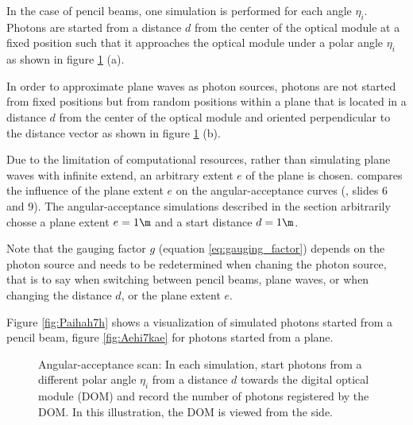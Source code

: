 In the case of pencil beams, one simulation is performed for each angle $\eta_i$. Photons are started from a distance $d$ from the center of the optical module at a fixed position such that it approaches the optical module under a polar angle $\eta_i$ as shown in figure \ref{fig:quie8Oof} (a).

In order to approximate plane waves as photon sources, photons are not started from fixed positions but from random positions within a plane that is located in a distance $d$ from the center of the optical module and oriented perpendicular to the distance vector as shown in figure \ref{fig:quie8Oof} (b).

Due to the limitation of computational resources, rather than simulating plane waves with infinite extend, an arbitrary extent $e$ of the plane is chosen.  \cite{martindardupdate} compares the influence of the plane extent $e$ on the angular-acceptance curves (\cite{martindardupdate}, slides 6 and 9). The angular-acceptance simulations described in the section arbitrarily chosse a plane extent $e = 1\m$ and a start distance $d = 1\m$.

Note that the gauging factor $g$ (equation \ref{eq:gauging_factor}) depends on the photon source and needs to be redetermined when chaning the photon source, that is to say when switching between pencil beams, plane waves, or when changing the distance $d$, or the plane extent $e$.

Figure \ref{fig:Paihah7h} shows a  visualization of simulated photons started from a pencil beam, figure \ref{fig:Aehi7kae} for photons started from a plane.


\begin{figure}[htbp]
  \hfill
  \caption{Angular-acceptance scan: In each simulation, start photons from a different polar angle $\eta_i$ from a distance $d$ towards the digital optical module (DOM) and record the number of photons registered by the DOM. In this illustration, the DOM is viewed from the side.}
  \label{fig:quie8Oof}
\end{figure}

